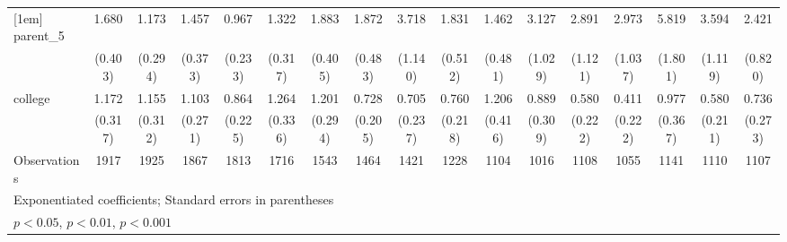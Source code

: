 {\begin{tabular}{l*{16}{c}}
[1em]
parent\_5            &       1.680\sym{*}  &       1.173         &       1.457         &       0.967         &       1.322         &       1.883\sym{**} &       1.872\sym{*}  &       3.718\sym{***}&       1.831\sym{*}  &       1.462         &       3.127\sym{***}&       2.891\sym{**} &       2.973\sym{**} &       5.819\sym{***}&       3.594\sym{***}&       2.421\sym{**} \\
                    &     (0.403)         &     (0.294)         &     (0.373)         &     (0.233)         &     (0.317)         &     (0.405)         &     (0.483)         &     (1.140)         &     (0.512)         &     (0.481)         &     (1.029)         &     (1.121)         &     (1.037)         &     (1.801)         &     (1.119)         &     (0.820)         \\
[1em]
college             &       1.172         &       1.155         &       1.103         &       0.864         &       1.264         &       1.201         &       0.728         &       0.705         &       0.760         &       1.206         &       0.889         &       0.580         &       0.411         &       0.977         &       0.580         &       0.736         \\
                    &     (0.317)         &     (0.312)         &     (0.271)         &     (0.225)         &     (0.336)         &     (0.294)         &     (0.205)         &     (0.237)         &     (0.218)         &     (0.416)         &     (0.309)         &     (0.222)         &     (0.222)         &     (0.367)         &     (0.211)         &     (0.273)         \\
\hline
Observations        &        1917         &        1925         &        1867         &        1813         &        1716         &        1543         &        1464         &        1421         &        1228         &        1104         &        1016         &        1108         &        1055         &        1141         &        1110         &        1107         \\
\hline\hline
\multicolumn{17}{l}{\footnotesize Exponentiated coefficients; Standard errors in parentheses}\\
\multicolumn{17}{l}{\footnotesize \sym{*} \(p<0.05\), \sym{**} \(p<0.01\), \sym{***} \(p<0.001\)}\\
\end{tabular}
}

